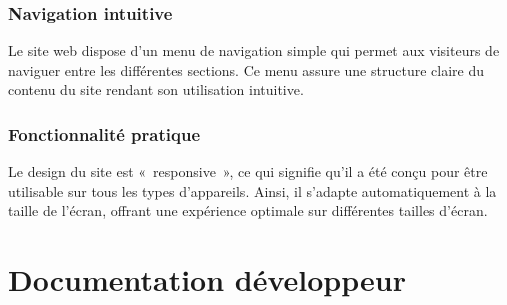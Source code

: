 \documentclass[a4,10pt,french]{sphinxmanual}
\begin{document}
\subsection{Navigation intuitive}
\label{\detokenize{chapitre-01:navigation-intuitive}}
\sphinxAtStartPar
Le site web dispose d’un menu de navigation simple qui permet aux visiteurs de naviguer entre les différentes sections. Ce menu assure une structure claire du contenu du site rendant son utilisation intuitive.


\subsection{Fonctionnalité pratique}
\label{\detokenize{chapitre-01:fonctionnalite-pratique}}
\sphinxAtStartPar
Le design du site est « responsive », ce qui signifie qu’il a été conçu pour être utilisable sur tous les types d’appareils. Ainsi, il s’adapte automatiquement à la taille de l’écran, offrant une expérience optimale sur différentes tailles d’écran.

\sphinxAtStartPar



\chapter{Documentation développeur}
\label{\detokenize{chapitre-02:documentation-developpeur}}\label{\detokenize{chapitre-02::doc}}
\end{document}
